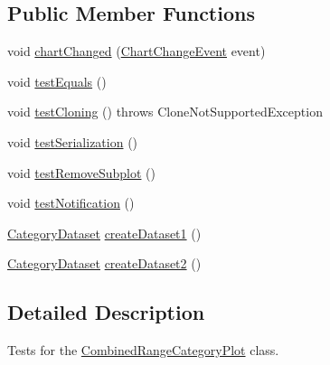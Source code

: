 \subsection*{Public Member Functions}
\begin{DoxyCompactItemize}
\item 
void \mbox{\hyperlink{classorg_1_1jfree_1_1chart_1_1plot_1_1_combined_range_category_plot_test_a57ff906ebc7c7d643edfcdd1289a8e03}{chart\+Changed}} (\mbox{\hyperlink{classorg_1_1jfree_1_1chart_1_1event_1_1_chart_change_event}{Chart\+Change\+Event}} event)
\item 
void \mbox{\hyperlink{classorg_1_1jfree_1_1chart_1_1plot_1_1_combined_range_category_plot_test_a7f5730b4856ba9345061a73d70e29660}{test\+Equals}} ()
\item 
void \mbox{\hyperlink{classorg_1_1jfree_1_1chart_1_1plot_1_1_combined_range_category_plot_test_a302550c27eff0d8212ea99eea5921483}{test\+Cloning}} ()  throws Clone\+Not\+Supported\+Exception 
\item 
void \mbox{\hyperlink{classorg_1_1jfree_1_1chart_1_1plot_1_1_combined_range_category_plot_test_a06ed432ff4753e62864709d391a3ec55}{test\+Serialization}} ()
\item 
void \mbox{\hyperlink{classorg_1_1jfree_1_1chart_1_1plot_1_1_combined_range_category_plot_test_ae1864cb3d41d6aadb526ee24ae211a9d}{test\+Remove\+Subplot}} ()
\item 
void \mbox{\hyperlink{classorg_1_1jfree_1_1chart_1_1plot_1_1_combined_range_category_plot_test_a5773c3553b435a66228ef3193e2b192d}{test\+Notification}} ()
\item 
\mbox{\hyperlink{interfaceorg_1_1jfree_1_1data_1_1category_1_1_category_dataset}{Category\+Dataset}} \mbox{\hyperlink{classorg_1_1jfree_1_1chart_1_1plot_1_1_combined_range_category_plot_test_a58ed633d0efe776a5fb60116a27d0f1e}{create\+Dataset1}} ()
\item 
\mbox{\hyperlink{interfaceorg_1_1jfree_1_1data_1_1category_1_1_category_dataset}{Category\+Dataset}} \mbox{\hyperlink{classorg_1_1jfree_1_1chart_1_1plot_1_1_combined_range_category_plot_test_a077988fd37c9177375623d396d801b52}{create\+Dataset2}} ()
\end{DoxyCompactItemize}


\subsection{Detailed Description}
Tests for the \mbox{\hyperlink{classorg_1_1jfree_1_1chart_1_1plot_1_1_combined_range_category_plot}{Combined\+Range\+Category\+Plot}} class. 

